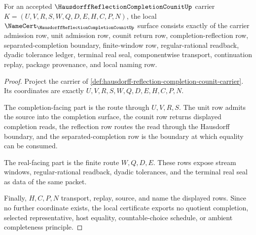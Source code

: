 \begin{theorem}
\label{thm:hausdorff-reflection-completion-counit-obligations}
For an accepted $\HausdorffReflectionCompletionCounitUp$ carrier $K=(U,V,R,S,W,Q,D,E,H,C,P,N)$, the local $\NameCert_{\HausdorffReflectionCompletionCounitUp}$ surface consists exactly of the carrier admission row, unit admission row, counit return row, completion-reflection row, separated-completion boundary, finite-window row, regular-rational readback, dyadic tolerance ledger, terminal real seal, componentwise transport, continuation replay, package provenance, and local naming row.
\end{theorem}
\begin{proof}
Project the carrier of \autoref{def:hausdorff-reflection-completion-counit-carrier}. Its coordinates are exactly $U,V,R,S,W,Q,D,E,H,C,P,N$.

The completion-facing part is the route through $U,V,R,S$. The unit row admits the source into the completion surface, the counit row returns displayed completion reads, the reflection row routes the read through the Hausdorff boundary, and the separated-completion row is the boundary at which equality can be consumed.

The real-facing part is the finite route $W,Q,D,E$. These rows expose stream windows, regular-rational readback, dyadic tolerances, and the terminal real seal as data of the same packet.

Finally, $H,C,P,N$ transport, replay, source, and name the displayed rows. Since no further coordinate exists, the local certificate exports no quotient completion, selected representative, host equality, countable-choice schedule, or ambient completeness principle.
\end{proof}


